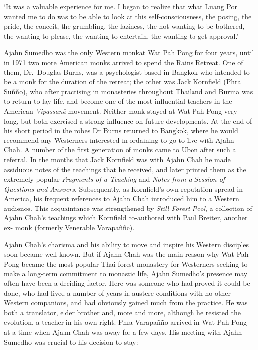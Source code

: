 `It was a valuable experience for me. I
began to realize that what Luang Por wanted me to do was to be able to
look at this self-consciousness, the posing, the pride, the conceit, the
grumbling, the laziness, the not-wanting-to-be-bothered, the wanting to
please, the wanting to entertain, the wanting to get approval.'

Ajahn Sumedho was the only Western monkat Wat Pah Pong for four years,
until in 1971 two more American monks arrived to spend the Rains
Retreat. One of them, Dr.~Douglas Burns, was a psychologist based in
Bangkok who intended to be a monk for the duration of the retreat; the
other was Jack Kornfield (Phra Suñño), who after practising in
monasteries throughout Thailand and Burma was to return to lay life, and
become one of the most influential teachers in the American
\emph{Vipassanā} movement. Neither monk stayed at Wat Pah Pong very
long, but both exercised a strong influence on future developments. At
the end of his short period in the robes Dr Burns returned to Bangkok,
where he would recommend any Westerners interested in ordaining to go to
live with Ajahn Chah. A number of the first generation of monks came to
Ubon after such a referral. In the months that Jack Kornfield was with
Ajahn Chah he made assiduous notes of the teachings that he received,
and later printed them as the extremely popular \emph{Fragments of a
Teaching} and \emph{Notes from a Session of Questions and Answers}.
Subsequently, as Kornfield's own reputation spread in America, his
frequent references to Ajahn Chah introduced him to a Western audience.
This acquaintance was strengthened by \emph{Still Forest Pool}, a
collection of Ajahn Chah's teachings which Kornfield co-authored with
Paul Breiter, another ex- monk (formerly Venerable Varapañño).

Ajahn Chah's charisma and his ability to move and inspire his Western
disciples soon became well-known. But if Ajahn Chah was the main reason
why Wat Pah Pong became the most popular Thai forest monastery for
Westerners seeking to make a long-term commitment to monastic life,
Ajahn Sumedho's presence may often have been a deciding factor. Here was
someone who had proved it could be done, who had lived a number of years
in austere conditions with no other Western companions, and had
obviously gained much from the practice. He was both a translator, elder
brother and, more and more, although he resisted the evolution, a
teacher in his own right. Phra Varapañño arrived in Wat Pah Pong at a
time when Ajahn Chah was away for a few days. His meeting with Ajahn
Sumedho was crucial to his decision to stay:

